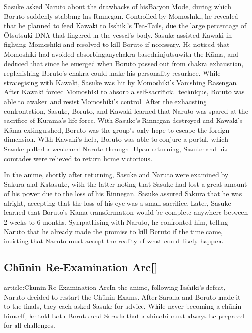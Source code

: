 \documentclass[a4paper,12pt]{article}
\begin{document}
Sasuke asked Naruto about the drawbacks of hisBaryon Mode, during which Boruto suddenly stabbing his Rinnegan. Controlled by Momoshiki, he revealed that he planned to feed Kawaki to Isshiki's Ten-Tails, due the large percentage of Ōtsutsuki DNA that lingered in the vessel's body. Sasuke assisted Kawaki in fighting Momoshiki and resolved to kill Boruto if necessary. He noticed that Momoshiki had avoided absorbinganychakra-basedninjutsuwith the Kāma, and deduced that since he emerged when Boruto passed out from chakra exhaustion, replenishing Boruto's chakra could make his personality resurface. While strategising with Kawaki, Sasuke was hit by Momoshiki's Vanishing Rasengan. After Kawaki forced Momoshiki to absorb a self-sacrificial technique, Boruto was able to awaken and resist Momoshiki's control. After the exhausting confrontation, Sasuke, Boruto, and Kawaki learned that Naruto was spared at the sacrifice of Kurama's life force. With Sasuke's Rinnegan destroyed and Kawaki's Kāma extinguished, Boruto was the group's only hope to escape the foreign dimension. With Kawaki's help, Boruto was able to conjure a portal, which Sasuke pulled a weakened Naruto through. Upon returning, Sasuke and his comrades were relieved to return home victorious.\\ \par \vspace{0.5cm}

In the anime, shortly after returning, Sasuke and Naruto were examined by Sakura and Katasuke, with the latter noting that Sasuke had lost a great amount of his power due to the loss of his Rinnegan. Sasuke assured Sakura that he was alright, accepting that the loss of his eye was a small sacrifice. Later, Sasuke learned that Boruto's Kāma transformation would be complete anywhere between 2 weeks to 6 months. Sympathising with Naruto, he confronted him, telling Naruto that he already made the promise to kill Boruto if the time came, insisting that Naruto must accept the reality of what could likely happen.\\ \par \vspace{0.5cm}

\subsection*{Chūnin Re-Examination Arc[]}\n\nMain article:Chūnin Re-Examination ArcIn the anime, following Isshiki's defeat, Naruto decided to restart the Chūnin Exams. After Sarada and Boruto made it to the finals, they each asked Sasuke for advice. While never becoming a chūnin himself, he told both Boruto and Sarada that a shinobi must always be prepared for all challenges.\\ \par \vspace{0.5cm}
\end{document}
